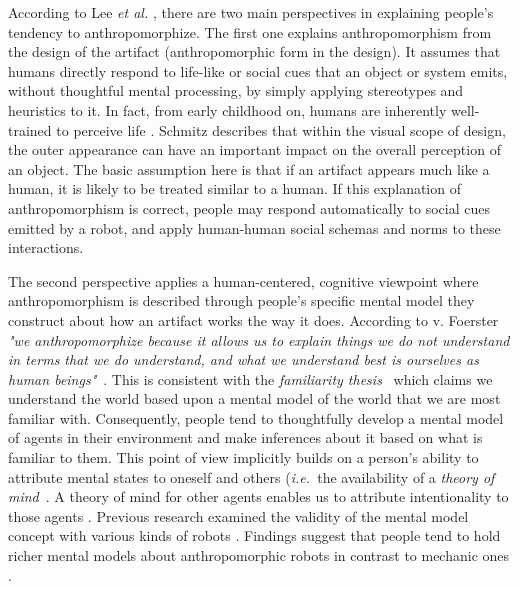 \documentclass{acm_proc_article-sp}
\newcommand{\ie}{{\textit{i.e.~}}}
\begin{document}
According to Lee \textit{et al.} \cite{lee_human_2005},
there are two main perspectives in explaining people's tendency to
anthropomorphize. The first one explains anthropomorphism from the design of
the artifact (anthropomorphic form in the design). It assumes that humans
directly respond to life-like or social cues that an object or system emits,
without thoughtful mental processing, by simply applying stereotypes and
heuristics to it. In fact, from early childhood on, humans are inherently
well-trained to perceive life \cite{epley_seeing_2007}. Schmitz
\cite{schmitz_concepts_2011} describes that within the visual scope of design,
the outer appearance can have an important impact on the overall perception of
an object. The basic assumption here is that if an artifact appears much like a
human, it is likely to be treated similar to a human. If this explanation of
anthropomorphism is correct, people may respond automatically to social cues
emitted by a robot, and apply human-human social schemas and norms to these
interactions.

The second perspective applies a human-centered, cognitive viewpoint where
anthropomorphism is described through people's specific mental model they
construct about how an artifact works the way it does. According to v.
Foerster  \textit{"we anthropomorphize because it allows us to
explain things we do not understand in terms that we do understand, and what we
understand best is ourselves as human beings"}~\cite{hegel_understanding_2008}.
This is consistent with the \emph{familiarity
thesis}~\cite{hegel_understanding_2008} which claims we understand the world
based upon a mental model of the world that we are most familiar with.
Consequently, people tend to thoughtfully develop a mental model of agents in
their environment and make inferences about it based on what is familiar to
them. This point of view implicitly builds on a person's ability to attribute
mental states to oneself and others (\ie the availability of a \emph{theory of
mind}~\cite{Premack1978}. A theory of  mind for other agents enables us to
attribute intentionality to those agents
\cite{leslie_pretense_1987,admoni_multi-category_2012}. Previous research
examined the validity of the mental model concept with various kinds of robots
\cite{schmitz_concepts_2011,kiesler_mental_2002}. Findings suggest that people
tend to hold richer mental models about anthropomorphic robots in contrast to
mechanic ones \cite{kiesler_mental_2002}.
\end{document}
